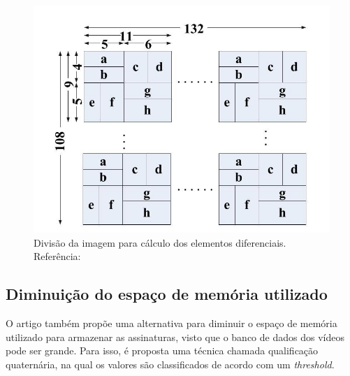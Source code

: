 \begin{figure}[h]
	\centering
    \label{fig:divsceneframe}
	\includegraphics[width=\textwidth]{dados/figuras/sf_division.png}
    \caption{Divisão da imagem para cálculo dos elementos diferenciais. Referência: \citeauthor{mao2015sceneframe}}
\end{figure}

\subsection{Diminuição do espaço de memória utilizado}

O artigo também propõe uma alternativa para diminuir o espaço de memória utilizado para armazenar as assinaturas, visto que o banco de dados dos vídeos pode ser grande. Para isso, é proposta uma técnica chamada qualificação quaternária, na qual os valores são classificados de acordo com um \textit{threshold}.



